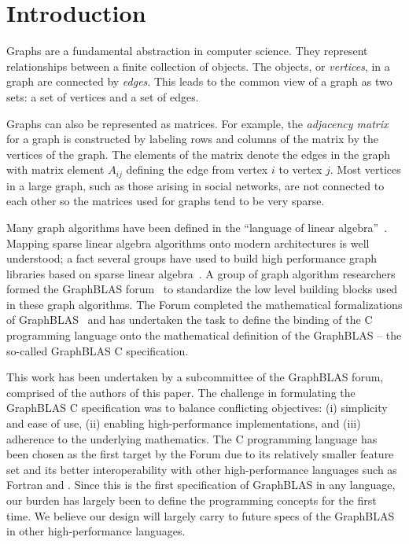 \section{Introduction}
\label{sec:intro}

Graphs are a fundamental abstraction in computer science.  They represent
relationships between a finite collection of objects.   The objects, or
\emph{vertices}, in a graph are connected by \emph{edges}.  This leads
to the common view of a graph as two sets: a set of vertices and a set
of edges.

Graphs can also be represented as matrices.   For example, the
\emph{adjacency matrix} for a graph is constructed by labeling rows and
columns of the matrix by the vertices of the graph.  The elements of
the matrix denote the edges in the graph with matrix element $A_{ij}$
defining the edge from vertex $i$ to vertex $j$.  Most
vertices in a large graph, such as those arising in social networks,
are not connected to each other so the matrices used for graphs tend to
be very sparse.

Many graph algorithms have been defined in the ``language of linear
algebra''~\cite{kepner2011graph}.  Mapping sparse linear algebra algorithms 
onto modern architectures is well understood; a fact several 
groups have used to build high
performance graph libraries based on sparse linear algebra~\cite{combblas,
gadepally2015graphulo, gpi2016, sundaram2015graphmat,che2016programming}.  A group
of graph algorithm researchers formed the GraphBLAS
forum~\cite{graphblas_web} to standardize the low level building
blocks used in these graph algorithms.  The Forum completed the
mathematical formalizations of GraphBLAS~\cite{mathgraphblas16} and
has undertaken the task to define the
binding of the C programming language onto the mathematical definition of
the GraphBLAS -- the so-called GraphBLAS C specification.  
 

This work has been undertaken by a subcommittee of the GraphBLAS forum, comprised of
the authors of this paper.  The challenge in formulating
the GraphBLAS C specification was to balance conflicting 
objectives: (i) simplicity and ease of use,
(ii) enabling high-performance implementations, and (iii) adherence to
the underlying mathematics. 
The C programming language has been chosen as the first target by the Forum due
to its relatively smaller feature set and its better interoperability with other high-performance 
languages such as Fortran and \Cpp.
Since this is the first specification of GraphBLAS in any language, our burden 
has largely been to define the programming concepts for the first time. We believe
our design will largely carry to future specs of the GraphBLAS in other high-performance
languages. 


